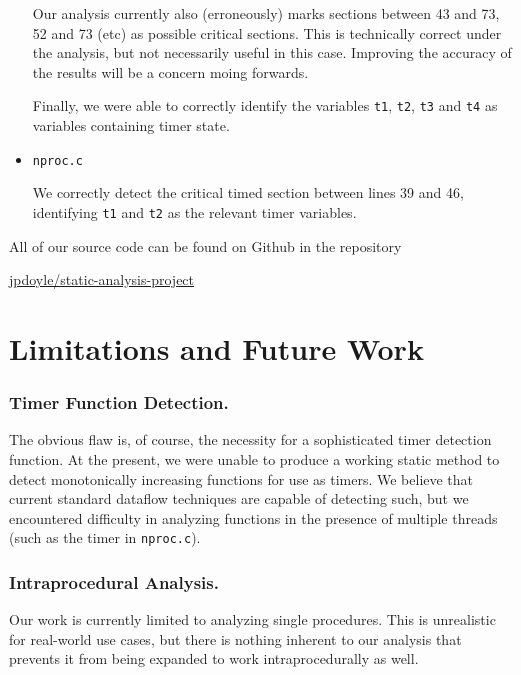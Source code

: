 \documentclass[12pt]{article}
\begin{document}
\begin{multicols*}{2}
\begin{itemize}
  Our analysis currently also (erroneously) marks sections between 43 and 73,
  52 and 73 (etc) as possible critical sections. This is technically correct
  under the analysis, but not necessarily useful in this case. Improving the
  accuracy of the results will be a concern moing forwards.

      Finally, we were able to correctly identify the variables \texttt{t1},
      \texttt{t2}, \texttt{t3} and \texttt{t4} as variables containing timer
      state.

    \item \texttt{nproc.c}

      We correctly detect the critical timed section between lines 39 and 46,
      identifying \texttt{t1} and \texttt{t2} as the relevant timer variables.
  \end{itemize}

  All of our source code can be found on Github in the repository

  \href{https://github.com/jpdoyle/static-analysis-project}{jpdoyle/static-analysis-project}

  \section{Limitations and Future Work}

  \subsubsection*{Timer Function Detection.}

  The obvious flaw is, of course, the necessity for a sophisticated timer
  detection function. At the present, we were unable to produce a working
  static method to detect monotonically increasing functions for use as timers.
  We believe that current standard dataflow techniques are capable of detecting
  such, but we encountered difficulty in analyzing functions in the presence
  of multiple threads (such as the timer in \texttt{nproc.c}).

  \subsubsection*{Intraprocedural Analysis.}

  Our work is currently limited to analyzing single procedures. This is
  unrealistic for real-world use cases, but there is nothing inherent to our
  analysis that prevents it from being expanded to work intraprocedurally as
  well.


\end{multicols*}
\end{document}
